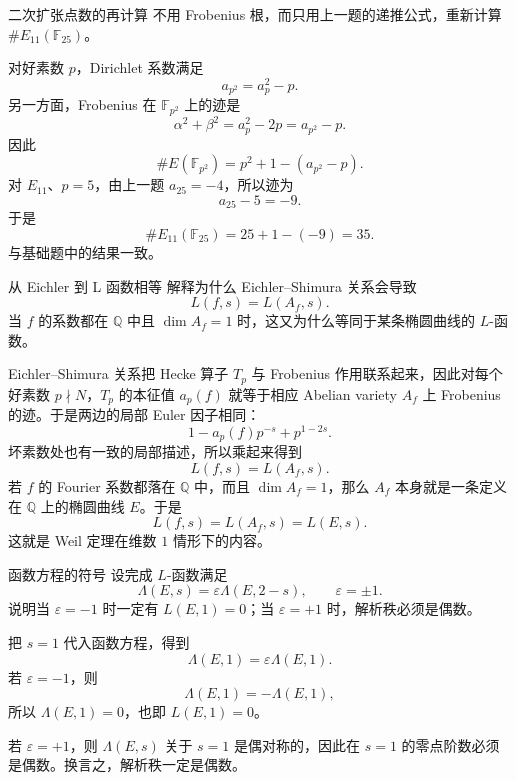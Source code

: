 \begin{problem}{二次扩张点数的再计算}
\medium
不用 Frobenius 根，而只用上一题的递推公式，重新计算 $\#E_{11}(\mathbb{F}_{25})$。
\end{problem}
\begin{solution}
对好素数 $p$，Dirichlet 系数满足
\[
a_{p^2}=a_p^2-p.
\]
另一方面，Frobenius 在 $\mathbb{F}_{p^2}$ 上的迹是
\[
\alpha^2+\beta^2=a_p^2-2p=a_{p^2}-p.
\]
因此
\[
\#E(\mathbb{F}_{p^2})=p^2+1-(a_{p^2}-p).
\]
对 $E_{11}$、$p=5$，由上一题 $a_{25}=-4$，所以迹为
\[
a_{25}-5=-9.
\]
于是
\[
\#E_{11}(\mathbb{F}_{25})=25+1-(-9)=35.
\]
与基础题中的结果一致。
\end{solution}

\begin{problem}{从 Eichler 到 L 函数相等}
\medium
解释为什么 Eichler--Shimura 关系会导致
\[
L(f,s)=L(A_f,s).
\]
当 $f$ 的系数都在 $\mathbb{Q}$ 中且 $\dim A_f=1$ 时，这又为什么等同于某条椭圆曲线的 $L$-函数。
\end{problem}
\begin{solution}
Eichler--Shimura 关系把 Hecke 算子 $T_p$ 与 Frobenius 作用联系起来，因此对每个好素数 $p\nmid N$，$T_p$ 的本征值 $a_p(f)$ 就等于相应 Abelian variety $A_f$ 上 Frobenius 的迹。于是两边的局部 Euler 因子相同：
\[
1-a_p(f)p^{-s}+p^{1-2s}.
\]
坏素数处也有一致的局部描述，所以乘起来得到
\[
L(f,s)=L(A_f,s).
\]
若 $f$ 的 Fourier 系数都落在 $\mathbb{Q}$ 中，而且 $\dim A_f=1$，那么 $A_f$ 本身就是一条定义在 $\mathbb{Q}$ 上的椭圆曲线 $E$。于是
\[
L(f,s)=L(A_f,s)=L(E,s).
\]
这就是 Weil 定理在维数 $1$ 情形下的内容。
\end{solution}

\begin{problem}{函数方程的符号}
\medium
设完成 $L$-函数满足
\[
\Lambda(E,s)=\varepsilon\Lambda(E,2-s),\qquad \varepsilon=\pm1.
\]
说明当 $\varepsilon=-1$ 时一定有 $L(E,1)=0$；当 $\varepsilon=+1$ 时，解析秩必须是偶数。
\end{problem}
\begin{solution}
把 $s=1$ 代入函数方程，得到
\[
\Lambda(E,1)=\varepsilon\Lambda(E,1).
\]
若 $\varepsilon=-1$，则
\[
\Lambda(E,1)=-\Lambda(E,1),
\]
所以 $\Lambda(E,1)=0$，也即 $L(E,1)=0$。

若 $\varepsilon=+1$，则 $\Lambda(E,s)$ 关于 $s=1$ 是偶对称的，因此在 $s=1$ 的零点阶数必须是偶数。换言之，解析秩一定是偶数。
\end{solution}


